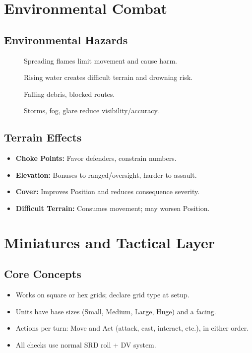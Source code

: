 \section{Environmental Combat}
\label{sec:environmental-combat}
\subsection{Environmental Hazards}
\label{subsec:environmental-hazards}
\begin{description}
  \item[] Spreading flames limit movement and cause harm.
  \item[] Rising water creates difficult terrain and drowning risk.
  \item[] Falling debris, blocked routes.
  \item[] Storms, fog, glare reduce visibility/accuracy.
\end{description}
\subsection{Terrain Effects}
\label{subsec:terrain-effects}
\begin{itemize}
  \item \textbf{Choke Points:} Favor defenders, constrain numbers.
  \item \textbf{Elevation:} Bonuses to ranged/oversight, harder to assault.
  \item \textbf{Cover:} Improves Position and reduces consequence severity.
  \item \textbf{Difficult Terrain:} Consumes movement; may worsen Position.
\end{itemize}

\section{Miniatures and Tactical Layer}
\label{sec:miniatures}

\subsection{Core Concepts}
\begin{itemize}
  \item Works on square or hex grids; declare grid type at setup.
  \item Units have base sizes (Small, Medium, Large, Huge) and a facing.
  \item Actions per turn: Move and Act (attack, cast, interact, etc.), in either order.
  \item All checks use normal SRD roll + DV system.
\end{itemize}

